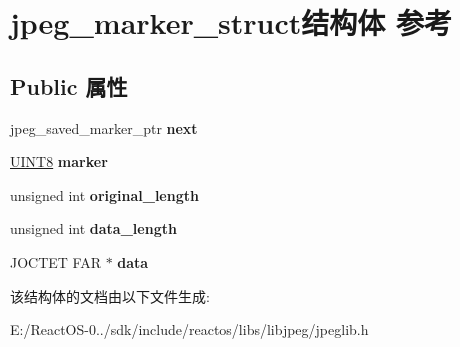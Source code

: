 \hypertarget{structjpeg__marker__struct}{}\section{jpeg\+\_\+marker\+\_\+struct结构体 参考}
\label{structjpeg__marker__struct}
\subsection*{Public 属性}
\begin{DoxyCompactItemize}
\item 
\mbox{\label{structjpeg__marker__struct_a1cb619806ea91b42a46b2a04fafabd82}} 
jpeg\+\_\+saved\+\_\+marker\+\_\+ptr {\bfseries next}
\item 
\mbox{\label{structjpeg__marker__struct_a154cf70fc9b4f86da631ca08a12a8d33}} 
\hyperlink{_processor_bind_8h_ab27e9918b538ce9d8ca692479b375b6a}{U\+I\+N\+T8} {\bfseries marker}
\item 
\mbox{\label{structjpeg__marker__struct_a3b17d58a17fa6be8560b697da814dfd3}} 
unsigned int {\bfseries original\+\_\+length}
\item 
\mbox{\label{structjpeg__marker__struct_a98412e9bccde6954ce55f611ad146a6b}} 
unsigned int {\bfseries data\+\_\+length}
\item 
\mbox{\label{structjpeg__marker__struct_ac8d0d5b3294a6ac3629640d4164a1ea6}} 
J\+O\+C\+T\+ET F\+AR $\ast$ {\bfseries data}
\end{DoxyCompactItemize}


该结构体的文档由以下文件生成\+:\begin{DoxyCompactItemize}
\item 
E\+:/\+React\+O\+S-\/0../sdk/include/reactos/libs/libjpeg/jpeglib.\+h\end{DoxyCompactItemize}
